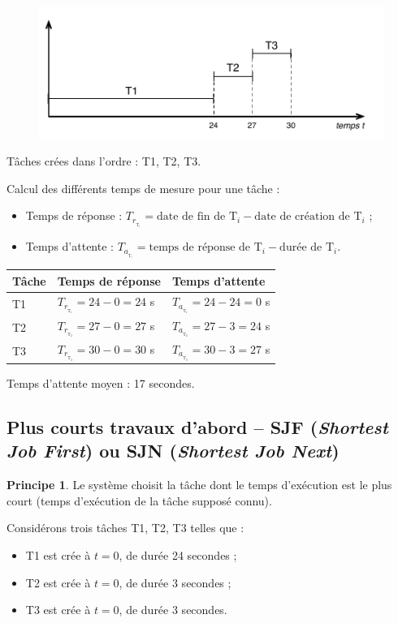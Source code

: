 \documentclass[11pt,english,french]{scrreprt}
\theoremstyle{remark}
\theoremstyle{definition}
\newtheorem*{ppe*}{Principe}
\begin{document}
\begin{figure}[h!]
	\center
	\includegraphics[scale=.65]{img/diagramme-gantt-batch}
\end{figure}


Tâches crées dans l'ordre : T1, T2, T3.

Calcul des différents temps de mesure pour une tâche :
\begin{itemize}
	\item Temps de réponse : $T_{r_{_{\mathrm{T}_{i}}}}=\textrm{date de fin de }\textrm{T}_{i}-\textrm{date de création de }\textrm{T}_{i}$ ;
	\item Temps d'attente : $T_{a_{_{\mathrm{T}_{i}}}}=\textrm{temps de réponse de }\textrm{T}_i - \textrm{durée de }\textrm{T}_i$.
\end{itemize}

\begin{tabularx}{\linewidth}{lXX}
	\toprule
	Tâche & Temps de réponse & Temps d'attente\tabularnewline
	\midrule
	\midrule
	T1 & $T_{r_{_{\mathrm{T}_{1}}}} = 24-0=24$ s & $T_{a_{_{\mathrm{T}_{1}}}} = 24-24=0$ s\tabularnewline
	\midrule
	T2 & $T_{r_{_{\mathrm{T}_{2}}}} = 27-0=27$ s & $T_{a_{_{\mathrm{T}_{2}}}} = 27-3=24$ s\tabularnewline
	\midrule
	T3 & $T_{r_{_{\mathrm{T}_{3}}}} = 30-0=30$ s & $T_{a_{_{\mathrm{T}_{3}}}} = 30-3=27$ s\tabularnewline
	\bottomrule
\end{tabularx}

Temps d'attente moyen : 17 secondes.

\subsection{Plus courts travaux d'abord -- SJF (\emph{Shortest Job First}) ou SJN (\emph{Shortest Job Next})} %
\begin{ppe*}
	Le système choisit la tâche dont le temps d'exécution est le plus court (temps d'exécution de la tâche supposé connu).
\end{ppe*}

Considérons trois tâches T1, T2, T3 telles que :\begin{itemize}
	\item T1 est crée à $t=0$, de durée 24 secondes ;
	\item T2 est crée à $t=0$, de durée 3 secondes ;
	\item T3 est crée à $t=0$, de durée 3 secondes.
\end{itemize}
\end{document}
